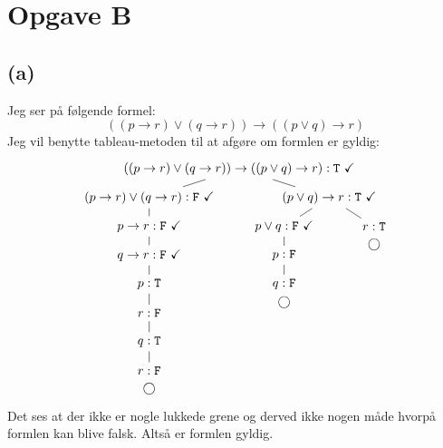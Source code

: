 \section*{Opgave B}

\subsection*{(a)}
Jeg ser på følgende formel:
\begin{equation}
  \left( \left( p \rightarrow r \right) \lor \left( q \rightarrow r \right) \right) \rightarrow \left( \left( p \lor q \right) \rightarrow r \right)
\end{equation}
Jeg vil benytte tableau-metoden til at afgøre om formlen er gyldig:
\begin{equation*}
  \begin{tikzpicture}[level distance=8mm,sibling distance=50mm]\tikzstyle{level 2}=[sibling distance=25mm]
    \node{$\left( \left( p \rightarrow r \right) \lor \left( q \rightarrow r \right) \right) \rightarrow \left( \left( p \lor q \right) \rightarrow r \right) : \T\ \checkmark$}
    child {
      node {$\left( p \rightarrow r \right) \lor \left( q \rightarrow r \right) : \F\ \checkmark$}
      child {
        node {$p \rightarrow r : \F\ \checkmark$}
        child {
          node {$q \rightarrow r : \F\ \checkmark$}
          child {
            node {$p : \T$}
            child {
              node {$r : \F$}
              child {
                node {$q : \T$}
                child {
                  node {$r : \F$}
                  \open
                }
              }
            }
          }
        }
      }
    }
    child {
      node {$\left( p \lor q \right) \rightarrow r : \T\ \checkmark$}
      child {
        node {$p \lor q : \F\ \checkmark$}
        child {
          node {$p : \F$}
          child {
            node {$q : \F$}
            \open
          }
        }
      }
      child {
        node {$r : \T$}
        \open
      }
    };
  \end{tikzpicture}
\end{equation*}
Det ses at der ikke er nogle lukkede grene og derved ikke nogen måde hvorpå formlen kan blive falsk. Altså er formlen gyldig.

